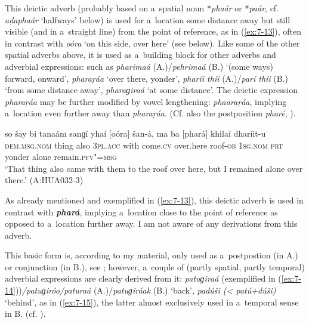  This deictic adverb (probably based on a~spatial
noun *\textit{phaár} or *\textit{paár}, cf. \textit{aḍaphaár} `halfways' below) is used
for a~location some distance away but still visible (and in a~straight line) from the point of
reference, as in (\ref{ex:7-13}), often in contrast with \textit{oóra} `on this side, over here'
(see below). Like some of the other spatial adverbs above, it is used as a~building block for other
adverbs and adverbial expressions: such as \textit{pharimaá} (A.)/\textit{pehrimaá} (B.)
`(some ways) forward, onward', \textit{pharaṛáa} `over there, yonder', \textit{pharíi
  thíi} (A.)/\textit{parí thíi} (B.) `from some distance away', \textit{pharaɡiraá}
`at some distance'. The deictic expression \textit{pharaṛáa} may be further modified by vowel
lengthening: \textit{phaaraṛáa}, implying a~location even further away than
\textit{pharaṛáa}. (Cf. also the postposition \textit{pharé}, ).

\begin{exe}
\ex
\label{ex:7-13}
\gll so šay bi tanaám sanɡí yhaí [oóra] šan-á, ma ba [phará] khilaí dharíit-u \\
\textsc{dem.msg.nom} thing also \textsc{3pl.acc} with come.\textsc{cv} over.here roof-\textsc{ob} \textsc{1sg.nom} \textsc{prt} yonder alone remain.\textsc{pfv"=msg}\\
\glt `That thing also came with them to the roof over here, but I remained alone over there.' (A:HUA032-3)
\end{exe}

 As already mentioned and exemplified in (\ref{ex:7-13}), this deictic adverb is used in contrast with \textbf{\textit{phará}}, implying a~location close to the point of reference as opposed to a~location further away. I am not aware of any derivations from this adverb. 

 This basic form is, according to my material, only used as a~postpostion (in A.) or conjunction (in B.), see ; however, a~couple of (partly spatial, partly temporal) adverbial expressions are clearly derived from it: \textit{patuɡiraá} (exemplified in (\ref{ex:7-14}))\textit{/patuɡiróo/paturaá} (A.)/\textit{patuɡiráak} (B.) `back', \textit{padúši ({\textless} patú+dúši)} `behind', as in (\ref{ex:7-15}), the latter almost exclusively used in a~temporal sense in B. (cf. ).

